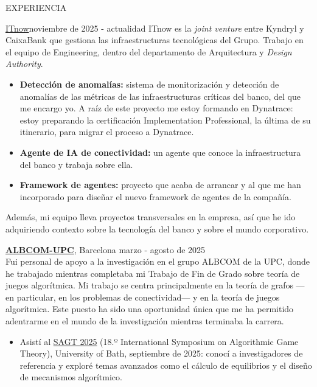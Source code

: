 \documentclass{resume} %
\begin{document}
\begin{rSection}{EXPERIENCIA}
  \begin{rSubsection}{\href{https://www.itnow.es/}{ITnow}}{noviembre
    de 2025 - actualidad}{}{}
    ITnow es la \emph{joint venture} entre Kyndryl y CaixaBank que
    gestiona las infraestructuras tecnológicas del Grupo. Trabajo en el
    equipo de Engineering, dentro del departamento de Arquitectura y
    \emph{Design Authority}.
    \begin{itemize}
      \item \textbf{Detección de anomalías:} sistema de monitorización y
        detección de anomalías de las métricas de las infraestructuras
        críticas del banco, del que me encargo yo. A raíz de este proyecto me
        estoy formando en Dynatrace: estoy preparando la certificación
        Implementation Professional, la última de su itinerario, para
        migrar el proceso a Dynatrace.
      \item \textbf{Agente de IA de conectividad:} un agente que conoce la
        infraestructura del banco y trabaja sobre ella.
      \item \textbf{Framework de agentes:} proyecto que acaba de arrancar
        y al que me han incorporado para diseñar el nuevo framework de
        agentes de la compañía.
    \end{itemize}
    Además, mi equipo lleva proyectos transversales en la empresa, así
    que he ido adquiriendo contexto sobre la tecnología del banco y
    sobre el mundo corporativo.
  \end{rSubsection}

  \textbf{\href{https://albcom.cs.upc.edu/}{ALBCOM-UPC}}, Barcelona
  \hfill {marzo - agosto de 2025} \\
  Fui personal de apoyo a la investigación en el grupo ALBCOM de la
  UPC, donde he trabajado mientras completaba mi Trabajo de Fin de
  Grado sobre teoría de juegos algorítmica. Mi trabajo se centra
  principalmente en la teoría de grafos ---en particular, en los
  problemas de conectividad--- y en la teoría de juegos algorítmica.
  Este puesto ha sido una oportunidad única que me ha permitido
  adentrarme en el mundo de la investigación mientras terminaba la
  carrera.
  \begin{itemize}
    \item Asistí al
      \href{https://www.bath.ac.uk/corporate-information/the-international-symposium-on-algorithmic-game-theory-sagt-2025-program}{SAGT
      2025} (18.º International Symposium on Algorithmic Game Theory),
      University of Bath, septiembre de 2025: conocí a investigadores de
      referencia y exploré temas avanzados como el cálculo de
      equilibrios y el diseño de mecanismos algorítmico.
  \end{itemize}


\end{rSection}
\end{document}
